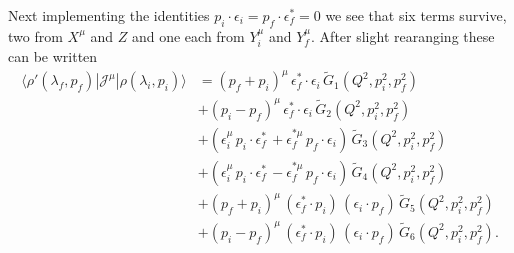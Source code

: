 {{Next implementing the identities $p_i\cdot \epsilon_i=p_f\cdot \epsilon_f^*=0$ we see that six terms survive, two from $X^\mu$ and $Z$ and one each from $Y_i^\mu$ and $Y_f^\mu$. 
%
} 
%
%
%
%
%
After slight rearanging these can be written
\begin{equation}
\begin{split}
\langle\rho'(\lambda_f,p_f)|{\mathcal{J}}^{\mu}|\rho(\lambda_i,p_i)\rangle
&=
(p_f+p_i)^\mu \,\epsilon_f^*\cdot \epsilon_i\, \widetilde{G}_1(Q^2,p_i^2,p_f^2)
\\&
+(p_i-p_f)^\mu \,\epsilon_f^*\cdot \epsilon_i\,\widetilde{G}_2(Q^2,p_i^2,p_f^2)
\\&
+\left(\epsilon_i^\mu\, p_i\cdot \epsilon_f^*\,+\epsilon_f^{*\mu}\, p_f\cdot \epsilon_i\right)
\,\widetilde{G}_3(Q^2,p_i^2,p_f^2)
\\&
+\left(\epsilon_i^\mu\, p_i\cdot \epsilon_f^*\,-\epsilon_f^{*\mu}\, p_f\cdot \epsilon_i\right)
\,\widetilde{G}_4(Q^2,p_i^2,p_f^2)
\\&
+(p_f+p_i)^\mu \,(\epsilon_f^*\cdot p_i)\,(\epsilon_i\cdot p_f)\,\widetilde{G}_5(Q^2,p_i^2,p_f^2)
\\&
+(p_i-p_f)^\mu \,(\epsilon_f^*\cdot p_i)\,(\epsilon_i\cdot p_f)\,\widetilde{G}_6(Q^2,p_i^2,p_f^2).
\end{split}
\end{equation}

}
